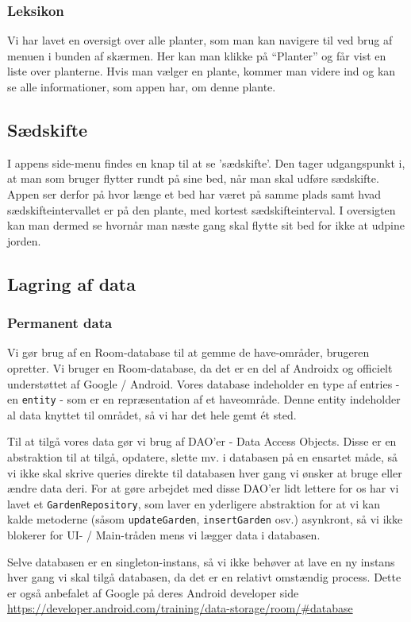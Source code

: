 \subsubsection{Leksikon}

Vi har lavet en oversigt over alle planter, som man kan navigere til ved brug af menuen i bunden af skærmen. Her kan man klikke på ``Planter'' og får vist en liste over planterne. Hvis man vælger en plante, kommer man videre ind og kan se alle informationer, som appen har, om denne plante.

\subsection{Sædskifte}
I appens side-menu findes en knap til at se 'sædskifte'. Den tager udgangspunkt i, at man som bruger flytter rundt på sine bed, når man skal udføre sædskifte. Appen ser derfor på hvor længe et bed har været på samme plads samt hvad sædskifteintervallet er på den plante, med kortest sædskifteinterval. I oversigten kan man dermed se hvornår man næste gang skal flytte sit bed for ikke at udpine jorden. 

\subsection{Lagring af data}

\subsubsection{Permanent data}
Vi gør brug af en Room-database til at gemme de have-områder, brugeren opretter. Vi bruger en Room-database, da det er en del af Androidx og officielt understøttet af Google / Android. Vores database indeholder en type af entries - en \texttt{entity} - som er en repræsentation af et haveområde. Denne entity indeholder al data knyttet til området, så vi har det hele gemt ét sted.

Til at tilgå vores data gør vi brug af DAO'er - Data Access Objects. Disse er en abstraktion til at tilgå, opdatere, slette mv. i databasen på en ensartet måde, så vi ikke skal skrive queries direkte til databasen hver gang vi ønsker at bruge eller ændre data deri.
For at gøre arbejdet med disse DAO'er lidt lettere for os har vi lavet et \texttt{GardenRepository}, som laver en yderligere abstraktion for at vi kan kalde metoderne (såsom \texttt{updateGarden}, \texttt{insertGarden} osv.) asynkront, så vi ikke blokerer for UI- / Main-tråden mens vi lægger data i databasen.

Selve databasen er en singleton-instans, så vi ikke behøver at lave en ny instans hver gang vi skal tilgå databasen, da det er en relativt omstændig process. Dette er også anbefalet af Google på deres Android developer side \hyperlink{https://developer.android.com/training/data-storage/room/#database}{https://developer.android.com/training/data-storage/room/#database}
